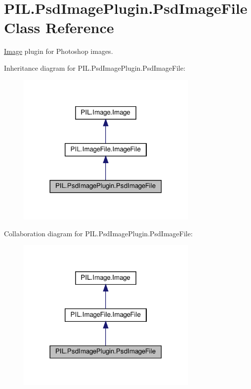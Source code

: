 \hypertarget{classPIL_1_1PsdImagePlugin_1_1PsdImageFile}{}\section{P\+I\+L.\+Psd\+Image\+Plugin.\+Psd\+Image\+File Class Reference}
\label{classPIL_1_1PsdImagePlugin_1_1PsdImageFile}


\hyperlink{namespacePIL_1_1Image}{Image} plugin for Photoshop images.  




Inheritance diagram for P\+I\+L.\+Psd\+Image\+Plugin.\+Psd\+Image\+File\+:
\nopagebreak
\begin{figure}[H]
\begin{center}
\leavevmode
\includegraphics[width=249pt]{classPIL_1_1PsdImagePlugin_1_1PsdImageFile__inherit__graph}
\end{center}
\end{figure}


Collaboration diagram for P\+I\+L.\+Psd\+Image\+Plugin.\+Psd\+Image\+File\+:
\nopagebreak
\begin{figure}[H]
\begin{center}
\leavevmode
\includegraphics[width=249pt]{classPIL_1_1PsdImagePlugin_1_1PsdImageFile__coll__graph}
\end{center}
\end{figure}
